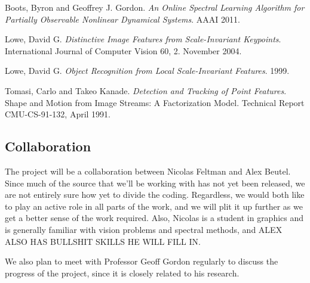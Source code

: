 \documentclass{article}
\begin{document}


	\begin{thebibliography}{9}

			Boots, Byron and Geoffrey J. Gordon.
			\emph{An Online Spectral Learning Algorithm for Partially Observable Nonlinear Dynamical Systems}.
			AAAI 2011.

			Lowe, David G.
			\emph{Distinctive Image Features from Scale-Invariant Keypoints}.
			International Journal of Computer Vision 60, 2. November 2004.

			Lowe, David G.
			\emph{Object Recognition from Local Scale-Invariant Features}.
			1999.

			Tomasi, Carlo and Takeo Kanade.
			\emph{Detection and Tracking of Point Features}.
			Shape and Motion from Image Streams: A Factorization Model.
			Technical Report CMU-CS-91-132,
			April 1991.

	\end{thebibliography}
	

	\subsection*{Collaboration} %
	\label{sub:Collaboration}

	The project will be a collaboration between Nicolas Feltman and Alex
	Beutel.  Since much of the source that we'll be working with has not yet been released,
	we are not entirely sure how yet to divide the coding.  Regardless, we would both like to 
	play an active role in all parts of the work, and we will plit it up further as we get a 
	better sense of the work required.  Also, Nicolas is a student
	in graphics and is generally familiar with vision problems and spectral methods, and 
	ALEX ALSO HAS BULLSHIT SKILLS HE WILL FILL IN.

	We also plan to meet with Professor Geoff Gordon regularly to discuss the
	progress of the project, since it is closely related to his research.
	

	
\end{document}
